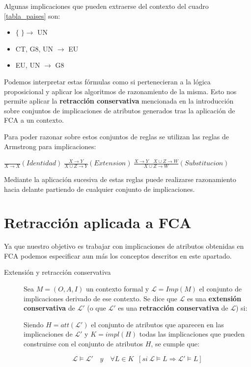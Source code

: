 	Algunas implicaciones que pueden extraerse del contexto del cuadro \ref{tabla_paises} son:
	
	\begin{itemize}
		\item $\{\;\} \rightarrow$ UN
		\item CT, G8, UN $\rightarrow$ EU
		\item EU, UN $\rightarrow$ G8 
	\end{itemize}

	 Podemos interpretar estas fórmulas como si pertenecieran a la lógica proposicional y aplicar los algoritmos de razonamiento de la misma. Esto nos permite aplicar la \textbf{retracción conservativa} mencionada en la introducción sobre conjuntos de implicaciones de atributos generados tras la aplicación de FCA a un contexto.
	 
	 Para poder razonar sobre estos conjuntos de reglas se utilizan las reglas de Armstrong  para implicaciones: 
	 
	 $
	 	\frac{}{X \to X} (Identidad) \; \frac{X \to Y}{X \cup Z \to Y}(Extension) \; \frac{X \to Y \quad X \cup Z \to W}{X \cup Z \to W}(Substitucion)
	 $
	
	Mediante la aplicación sucesiva de estas reglas puede realizarse razonamiento hacia delante partiendo de cualquier conjunto de implicaciones.
	
\section*{Retracción aplicada a FCA} 	

Ya que nuestro objetivo es trabajar con implicaciones de atributos obtenidas en FCA podemos especificar aun más los conceptos descritos en este apartado.

\begin{description}
	\item[Extensión y retracción conservativa] 
	Sea $M = (O,A,I)$ un contexto formal y $\mathcal{L} = Imp(M)$ el conjunto de implicaciones derivado de ese contexto. Se dice que $\mathcal{L}$ es una \textbf{extensión conservativa} de $\mathcal{L}'$ (o que $\mathcal{L}'$ es una \textbf{retracción conservativa} de $\mathcal{L}$) si:
	
	
	Siendo $H = att(\mathcal{L}')$ el conjunto de atributos que aparecen en las implicaciones de $\mathcal{L}'$ y $K = impl(H)$ todas las implicaciones que pueden construirse con el conjunto de atributos $H$, se cumple que: 
	
	
	\[ \mathcal{L} \models \mathcal{L}' \quad y \quad \forall L \in K \;\; [si \ \mathcal{L} \models L \Longrightarrow \mathcal{L}' \models L]  \]

\end{description}

